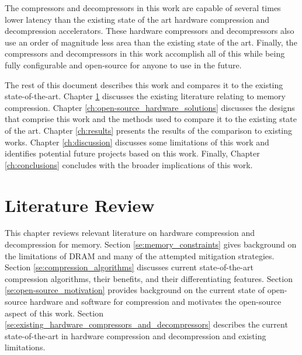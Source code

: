\documentclass[doublespace,nopageskip]{VTthesis}
\begin{document}
The compressors and decompressors in this work are capable of several times lower latency than the existing state of the art hardware compression and decompression accelerators. These hardware compressors and decompressors also use an order of magnitude less area than the existing state of the art. Finally, the compressors and decompressors in this work accomplish all of this while being fully configurable and open-source for anyone to use in the future. 

The rest of this document describes this work and compares it to the existing state-of-the-art. Chapter \ref{ch:literature_review} discusses the existing literature relating to memory compression. Chapter \ref{ch:open-source_hardware_solutions} discusses the designs that comprise this work and the methods used to compare it to the existing state of the art. Chapter \ref{ch:results} presents the results of the comparison to existing works. Chapter \ref{ch:discussion} discusses some limitations of this work and identifies potential future projects based on this work. Finally, Chapter \ref{ch:conclusions} concludes with the broader implications of this work.

\chapter{Literature Review} \label{ch:literature_review}
This chapter reviews relevant literature on hardware compression and decompression for memory. Section \ref{se:memory_constraints} gives background on the limitations of DRAM and many of the attempted mitigation strategies. Section \ref{se:compression_algorithms} discusses current state-of-the-art compression algorithms, their benefits, and their differentiating features. Section \ref{se:open-source_motivation} provides background on the current state of open-source hardware and software for compression and motivates the open-source aspect of this work. Section \ref{se:existing_hardware_compressors_and_decompressors} describes the current state-of-the-art in hardware compression and decompression and existing limitations.


\end{document}
